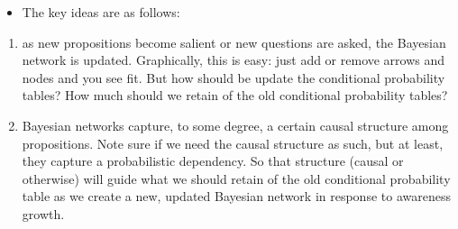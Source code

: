 \documentclass[
  11pt,
  dvipsnames,enabledeprecatedfontcommands]{scrartcl}
\providecommand{\tightlist}{%
  \setlength{\itemsep}{0pt}\setlength{\parskip}{0pt}}
\begin{document}
\begin{itemize}
\tightlist
\item
  The key ideas are as follows:
\end{itemize}

\begin{enumerate}
\def\labelenumi{(\arabic{enumi})}
\item
  as new propositions become salient or new questions are asked, the
  Bayesian network is updated. Graphically, this is easy: just add or
  remove arrows and nodes and you see fit. But how should be update the
  conditional probability tables? How much should we retain of the old
  conditional probability tables?
\item
  Bayesian networks capture, to some degree, a certain causal structure
  among propositions. Note sure if we need the causal structure as such,
  but at least, they capture a probabilistic dependency. So that
  structure (causal or otherwise) will guide what we should retain of
  the old conditional probability table as we create a new, updated
  Bayesian network in response to awareness growth.
\end{enumerate}
\end{document}
